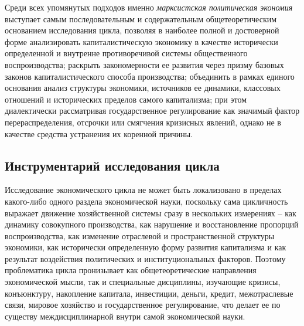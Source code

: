 Среди всех упомянутых подходов именно \textit{марксистская политическая экономия} выступает самым последовательным и содержательным общетеоретическим основанием исследования цикла, позволяя в наиболее полной и достоверной форме анализировать капиталистическую экономику в качестве исторически определенной и внутренне противоречивой системы общественного воспроизводства; раскрыть закономерности ее развития через призму базовых законов капиталистического способа производства; объединить в рамках единого основания анализ структуры экономики, источников ее динамики, классовых отношений и исторических пределов самого капитализма; при этом диалектически рассматривая государственное регулирование как значимый фактор перераспределения, отсрочки или смягчения кризисных явлений, однако не в качестве средства устранения их коренной причины.

\subsection{Инструментарий исследования цикла} %
Исследование экономического цикла не может быть локализовано в пределах какого-либо одного раздела экономической науки, поскольку сама цикличность выражает движение хозяйственной системы сразу в нескольких измерениях – как динамику совокупного производства, как нарушение и восстановление пропорций воспроизводства, как изменение отраслевой и пространственной структуры экономики, как исторически определенную форму развития капитализма и как результат воздействия политических и институциональных факторов. Поэтому проблематика цикла пронизывает как общетеоретические направления экономической мысли, так и специальные дисциплины, изучающие кризисы, конъюнктуру, накопление капитала, инвестиции, деньги, кредит, межотраслевые связи, мировое хозяйство и государственное регулирование, что делает ее по существу междисциплинарной внутри самой экономической науки.

